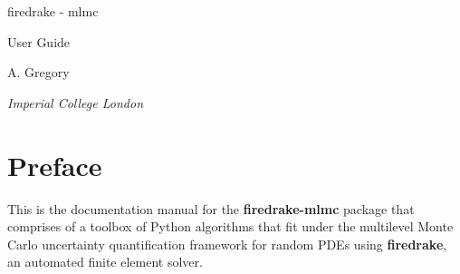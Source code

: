 \documentclass[10pt,letterpaper,extrafontsizes]{memoir}
\newcommand\svnidlong[4]{}
\begin{document}





\firmlists
\midsloppy
\raggedbottom
{}




\frontmatter
\pagestyle{empty}


\vspace*{\fill}
\begin{center}
\HUGE\textsf{firedrake - mlmc}\par
\end{center}
\bigskip
\begin{center}
\Huge\textsf{User Guide}\par
\end{center}
\bigskip
\begin{center}
\LARGE\textsf{A. Gregory}\par
\bigskip
\normalsize\textsf{\textit{Imperial College London}}\par
\medskip
\end{center}
\vspace*{\fill}
\def\THP{T\kern-0.2em H\kern-0.4em P}%
\def\THP{T\kern-0.15em H\kern-0.3em P}%

\clearpage




\cleardoublepage

\pagestyle{headings}

\clearpage
\tableofcontents
\setlength{\unitlength}{1pt}




\svnidlong
{$Ignore: $}
{$LastChangedDate: 2014-11-05 16:28:11 +0100 (Wed, 05 Nov 2014) $}
{$LastChangedRevision: 501 $}
{$LastChangedBy: daleif $}

\chapter{Preface}


    This is the documentation manual for the \textbf{firedrake-mlmc} package that comprises of a toolbox of Python algorithms that fit under the multilevel Monte Carlo uncertainty quantification framework for random PDEs using \textbf{firedrake}, an automated finite element solver.\\
    
\end{document}
